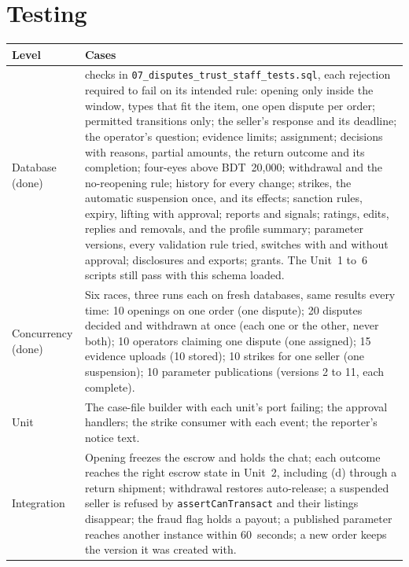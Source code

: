 \documentclass[11pt,a4paper]{article}
\newenvironment{dtable}[1]{\small\begin{longtable}{#1}}{\end{longtable}}
\begin{document}
\section{Testing}
\label{sec:testing}
\begin{dtable}{@{}>{\raggedright\arraybackslash}p{3.2cm}>{\raggedright\arraybackslash}p{12cm}@{}}
\toprule
\textbf{Level} & \textbf{Cases} \\ \midrule \endhead
Database (done) & 87 checks in \texttt{07\_disputes\_trust\_staff\_tests.sql}, each rejection required to fail on its intended rule: opening only inside the window, types that fit the item, one open dispute per order; permitted transitions only; the seller's response and its deadline; the operator's question; evidence limits; assignment; decisions with reasons, partial amounts, the return outcome and its completion; four-eyes above BDT~20{,}000; withdrawal and the no-reopening rule; history for every change; strikes, the automatic suspension once, and its effects; sanction rules, expiry, lifting with approval; reports and signals; ratings, edits, replies and removals, and the profile summary; parameter versions, every validation rule tried, switches with and without approval; disclosures and exports; grants. The Unit~1 to~6 scripts still pass with this schema loaded. \\
Concurrency (done) & Six races, three runs each on fresh databases, same results every time: 10 openings on one order (one dispute); 20 disputes decided and withdrawn at once (each one or the other, never both); 10 operators claiming one dispute (one assigned); 15 evidence uploads (10 stored); 10 strikes for one seller (one suspension); 10 parameter publications (versions 2 to 11, each complete). \\
Unit & The case-file builder with each unit's port failing; the approval handlers; the strike consumer with each event; the reporter's notice text. \\
Integration & Opening freezes the escrow and holds the chat; each outcome reaches the right escrow state in Unit~2, including (d) through a return shipment; withdrawal restores auto-release; a suspended seller is refused by \texttt{assertCanTransact} and their listings disappear; the fraud flag holds a payout; a published parameter reaches another instance within 60~seconds; a new order keeps the version it was created with. \\
\bottomrule
\end{dtable}
\end{document}
